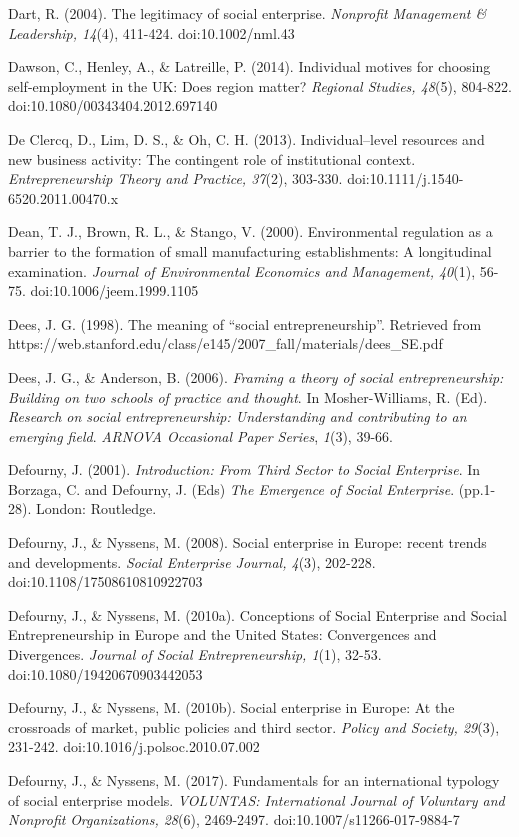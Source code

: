 \documentclass{article}
\begin{document}
Dart, R. (2004). The legitimacy of social enterprise. \emph{Nonprofit}\emph{ Management \& Leadership, 14}(4), 411-424. doi:10.1002/nml.43

Dawson, C., Henley, A., \& Latreille, P. (2014). Individual motives for choosing self-employment in the UK: Does region matter? \emph{Regional Studies, 48}(5), 804-822. doi:10.1080/00343404.2012.697140

De Clercq, D., Lim, D. S., \& Oh, C. H. (2013). Individual--level resources and new business activity: The contingent role of institutional context. \emph{Entrepreneurship Theory and Practice, 37}(2), 303-330. doi:10.1111/j.1540-6520.2011.00470.x

Dean, T. J., Brown, R. L., \& Stango, V. (2000). Environmental regulation as a barrier to the formation of small manufacturing establishments: A longitudinal examination. \emph{Journal of Environmental Economics and Management, 40}(1), 56-75. doi:10.1006/jeem.1999.1105

Dees, J. G. (1998). The meaning of “social entrepreneurship”. Retrieved from https://web.stanford.edu/class/e145/2007\_fall/materials/dees\_SE.pdf

Dees, J. G., \& Anderson, B. (2006). \emph{Framing a theory of social entrepreneurship: Building on two schools of practice and thought}. In Mosher-Williams, R. (Ed). \emph{Research on social entrepreneurship: Understanding and contributing to an emerging field}. \emph{ARNOVA Occasional Paper Series}, \emph{1}(3), 39-66. 

Defourny, J. (2001). \emph{Introduction: From Third Sector to Social Enterprise}. In Borzaga, C. and Defourny, J. (Eds) \emph{The Emergence of Social Enterprise}. (pp.1-28). London: Routledge.

Defourny, J., \& Nyssens, M. (2008). Social enterprise in Europe: recent trends and developments. \emph{Social Enterprise Journal, 4}(3), 202-228. doi:10.1108/17508610810922703

Defourny, J., \& Nyssens, M. (2010a). Conceptions of Social Enterprise and Social Entrepreneurship in Europe and the United States: Convergences and Divergences. \emph{Journal of Social Entrepreneurship, 1}(1), 32-53. doi:10.1080/19420670903442053

Defourny, J., \& Nyssens, M. (2010b). Social enterprise in Europe: At the crossroads of market, public policies and third sector. \emph{Policy and Society, 29}(3), 231-242. doi:10.1016/j.polsoc.2010.07.002

Defourny, J., \& Nyssens, M. (2017). Fundamentals for an international typology of social enterprise models. \emph{VOLUNTAS: International Journal of Voluntary and }\emph{Nonprofit}\emph{ Organizations, 28}(6), 2469-2497. doi:10.1007/s11266-017-9884-7
\end{document}
